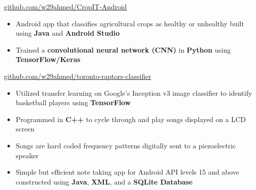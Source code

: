 

 {\href{https://github.com/w29ahmed/CropIT-Android}{github.com/w29ahmed/CropIT-Android}}
\begin{itemize}
\item Android app that classifies agricultural crops as healthy or unhealthy built using \textbf{Java} and \textbf{Android Studio}
\item Trained a \textbf{convolutional neural network (CNN)} in \textbf{Python} using \textbf{TensorFlow/Keras }
\end{itemize}

\divider

{\href{https://github.com/w29ahmed/toronto-raptors-classifier}{github.com/w29ahmed/toronto-raptors-classifier}}
\begin{itemize}
\item Utilized transfer learning on Google's Inception v3 image classifier to identify basketball players using \textbf{TensorFlow}
\end{itemize}

\divider

\begin{itemize}
\item Programmed in \textbf{C++} to cycle through and play songs displayed on a LCD screen
\item Songs are hard coded frequency patterns digitally sent to a piezoelectric speaker
\end{itemize}

\divider

\begin{itemize}
\item Simple but efficient note taking app for Android API levels 15 and above constructed using \textbf{Java}, \textbf{XML}, and a \textbf{SQLite Database }
\end{itemize}



